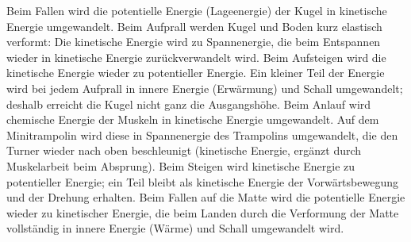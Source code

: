 \begin{abcliste}
\abc Beim Fallen wird die potentielle Energie (Lageenergie) der Kugel in kinetische Energie umgewandelt. Beim Aufprall werden Kugel und Boden kurz elastisch verformt: Die kinetische Energie wird zu Spannenergie, die beim Entspannen wieder in kinetische Energie zurückverwandelt wird. Beim Aufsteigen wird die kinetische Energie wieder zu potentieller Energie. Ein kleiner Teil der Energie wird bei jedem Aufprall in innere Energie (Erwärmung) und Schall umgewandelt; deshalb erreicht die Kugel nicht ganz die Ausgangshöhe.
\abc Beim Anlauf wird chemische Energie der Muskeln in kinetische Energie umgewandelt. Auf dem Minitrampolin wird diese in Spannenergie des Trampolins umgewandelt, die den Turner wieder nach oben beschleunigt (kinetische Energie, ergänzt durch Muskelarbeit beim Absprung). Beim Steigen wird kinetische Energie zu potentieller Energie; ein Teil bleibt als kinetische Energie der Vorwärtsbewegung und der Drehung erhalten. Beim Fallen auf die Matte wird die potentielle Energie wieder zu kinetischer Energie, die beim Landen durch die Verformung der Matte vollständig in innere Energie (Wärme) und Schall umgewandelt wird.
\end{abcliste}
